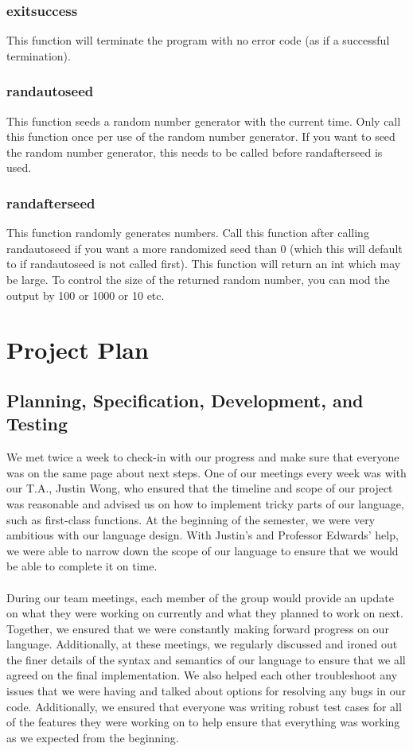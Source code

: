\documentclass[12pt]{article}
\begin{document}
\subsubsection{exit\textunderscore success}
This function will terminate the program with no error code (as if a successful termination).

\subsubsection{rand\textunderscore autoseed}
This function seeds a random number generator with the current time. Only call this function once per use of the random number generator. If you want to seed the random number generator, this needs to be called before rand\textunderscore afterseed is used.

\subsubsection{rand\textunderscore afterseed}
This function randomly generates numbers. Call this function after calling rand\textunderscore autoseed if you want a more randomized seed than 0 (which this will default to if rand\textunderscore autoseed is not called first). This function will return an int which may be large. To control the size of the returned random number, you can mod the output by 100 or 1000 or 10 etc.


\section{Project Plan}
\subsection{Planning, Specification, Development, and Testing}
We met twice a week to check-in with our progress and make sure that everyone was on the same page about next steps. One of our meetings every week was with our T.A., Justin Wong, who ensured that the timeline and scope of our project was reasonable and advised us on how to implement tricky parts of our language, such as first-class functions. At the beginning of the semester, we were very ambitious with our language design. With Justin’s and Professor Edwards’ help, we were able to narrow down the scope of our language to ensure that we would be able to complete it on time. \\
\\
During our team meetings, each member of the group would provide an update on what they were working on currently and what they planned to work on next. Together, we ensured that we were constantly making forward progress on our language. Additionally, at these meetings, we regularly discussed and ironed out the finer details of the syntax and semantics of our language to ensure that we all agreed on the final implementation. We also helped each other troubleshoot any issues that we were having and talked about options for resolving any bugs in our code. Additionally, we ensured that everyone was writing robust test cases for all of the features they were working on to help ensure that everything was working as we expected from the beginning.
\end{document}
